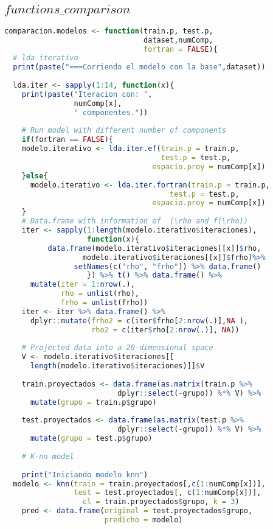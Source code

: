 \subsection{$functions\_comparison$}
\begin{lstlisting}[language=R, basicstyle=\small]
comparacion.modelos <- function(train.p, test.p, 
                                dataset,numComp, 
                                fortran = FALSE){
  # lda iterativo
  print(paste("===Corriendo el modelo con la base",dataset))
  
  lda.iter <- sapply(1:14, function(x){
    print(paste("Iteracion con: ", 
                numComp[x], 
                " componentes."))
    
    # Run model with different number of components
    if(fortran == FALSE){
    modelo.iterativo <- lda.iter.ef(train.p = train.p, 
                                    test.p = test.p, 
                                  espacio.proy = numComp[x])
    }else{
      modelo.iterativo <- lda.iter.fortran(train.p = train.p, 
                                      test.p = test.p, 
                                  espacio.proy = numComp[x])
    }
    # Data.frame with information of  (\rho and f(\rho))
    iter <- sapply(1:length(modelo.iterativo$iteraciones), 
                   function(x){
          data.frame(modelo.iterativo$iteraciones[[x]]$rho,
                  modelo.iterativo$iteraciones[[x]]$frho)%>% 
                setNames(c("rho", "frho")) %>% data.frame()
                   }) %>% t() %>% data.frame() %>% 
      mutate(iter = 1:nrow(.), 
             rho = unlist(rho),
             frho = unlist(frho))
    iter <- iter %>% data.frame() %>% 
      dplyr::mutate(frho2 = c(iter$frho[2:nrow(.)],NA ),
                    rho2 = c(iter$rho[2:nrow(.)], NA))
    
    # Projected data into a 20-dimensional space
    V <- modelo.iterativo$iteraciones[[
      length(modelo.iterativo$iteraciones)]]$V
    
    train.proyectados <- data.frame(as.matrix(train.p %>% 
                          dplyr::select(-grupo)) %*% V) %>%
      mutate(grupo = train.p$grupo)
    
    test.proyectados <- data.frame(as.matrix(test.p %>% 
                          dplyr::select(-grupo)) %*% V) %>%
      mutate(grupo = test.p$grupo)
    
    # K-nn model
    
    print("Iniciando modelo knn")
  modelo <- knn(train = train.proyectados[,c(1:numComp[x])], 
                test = test.proyectados[, c(1:numComp[x])], 
                  cl = train.proyectados$grupo, k = 3)
    pred <- data.frame(original = test.proyectados$grupo, 
                       predicho = modelo)
    

\end{lstlisting}
